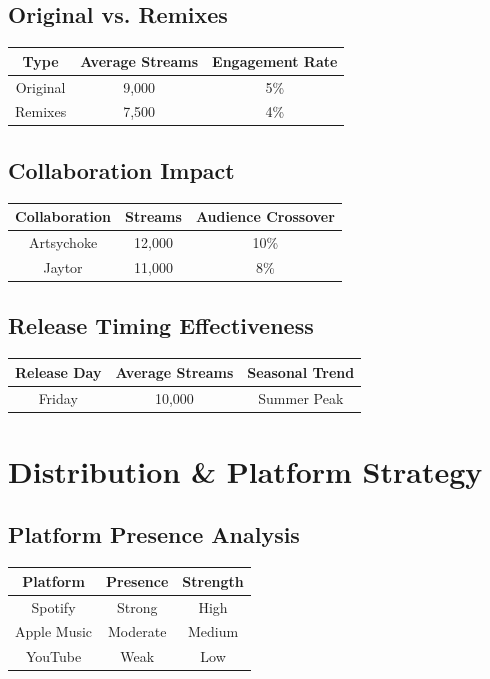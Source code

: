 \documentclass{report}
\begin{document}
\subsection{Original vs. Remixes}

\begin{tabular}{|c|c|c|}
    \hline
    \textbf{Type} & \textbf{Average Streams} & \textbf{Engagement Rate} \\
    \hline
    Original & 9,000 & 5\% \\
    Remixes & 7,500 & 4\% \\
    \hline
\end{tabular}

\subsection{Collaboration Impact}

\begin{tabular}{|c|c|c|}
    \hline
    \textbf{Collaboration} & \textbf{Streams} & \textbf{Audience Crossover} \\
    \hline
    Artsychoke & 12,000 & 10\% \\
    Jaytor & 11,000 & 8\% \\
    \hline
\end{tabular}

\subsection{Release Timing Effectiveness}

\begin{tabular}{|c|c|c|}
    \hline
    \textbf{Release Day} & \textbf{Average Streams} & \textbf{Seasonal Trend} \\
    \hline
    Friday & 10,000 & Summer Peak \\
    \hline
\end{tabular}

\newpage

\section{Distribution \& Platform Strategy}

\subsection{Platform Presence Analysis}

\begin{tabular}{|c|c|c|}
    \hline
    \textbf{Platform} & \textbf{Presence} & \textbf{Strength} \\
    \hline
    Spotify & Strong & High \\
    Apple Music & Moderate & Medium \\
    YouTube & Weak & Low \\
    \hline
\end{tabular}
\end{document}
